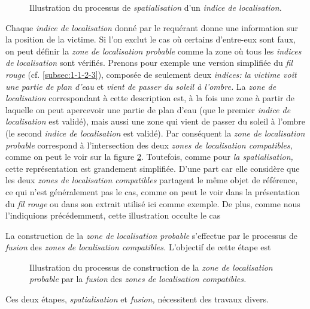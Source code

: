 \begin{figure}
  \centering
  
  \caption{Illustration du processus de \emph{spatialisation} d'un
    \emph{indice de localisation.}}
  \label{fig:obj_spa}
\end{figure}

Chaque \emph{indice de localisation} donné par le requérant donne une
information sur la position de la victime. Si l'on exclut le cas où
certains d'entre-eux sont faux, on peut définir la \emph{zone de
  localisation probable} comme la zone où tous les \emph{indices de
  localisation } sont vérifiés.
Prenons pour exemple une version simplifiée du \emph{fil rouge}
(cf. \autoref{subsec:1-1-2-3}), composée de seulement deux
\emph{indices:} \emph{la victime voit une partie de plan d'eau} et
\emph{vient de passer du soleil à l'ombre.}  La \emph{zone de
  localisation} correspondant à cette description est, à la fois une
zone à partir de laquelle on peut apercevoir une partie de plan d'eau
(\ie que le premier \emph{indice de localisation} est validé), mais
aussi une zone qui vient de passer du soleil à l'ombre (\ie le second
\emph{indice de localisation} est validé). Par conséquent la
\emph{zone de localisation probable} correspond à l'intersection des
deux \emph{zones de localisation compatibles,} comme on peut le voir
sur la figure \ref{fig:obj_fus}. Toutefois, comme pour \emph{la
  spatialisation,} cette représentation est grandement
simplifiée. D'une part car elle considère que les deux \emph{zones de
  localisation compatibles} partagent le même objet de référence, ce
qui n'est généralement pas le cas, comme on peut le voir dans la
présentation du \emph{fil rouge} ou dans son extrait utilisé ici comme
exemple. De plus, comme nous l'indiquions précédemment, cette
illustration occulte le cas 


La construction de la \emph{zone de localisation probable} s'effectue
par le processus de \emph{fusion} des \emph{zones de localisation
  compatibles.} L'objectif de cette étape est 


\begin{figure}
  \centering
  
  \caption{Illustration du processus de construction de la \emph{zone
      de localisation probable} par la \emph{fusion} des \emph{zones
      de localisation compatibles.}}
  \label{fig:obj_fus}
\end{figure}

Ces deux étapes, \emph{spatialisation} et \emph{fusion,} nécessitent
des travaux divers.


